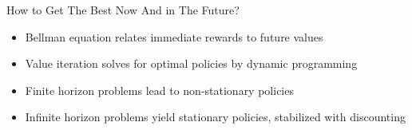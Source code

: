 \documentclass[11pt,table]{beamer}
\begin{document}
\begin{frame}{How to Get The Best Now And in The Future?}
\begin{itemize}
		\item Bellman equation relates immediate rewards to future values
    \item Value iteration solves for optimal policies by dynamic programming
    \item Finite horizon problems lead to non-stationary policies
    \item Infinite horizon problems yield stationary policies, stabilized with discounting
		\end{itemize}
\end{frame}
\end{document}
